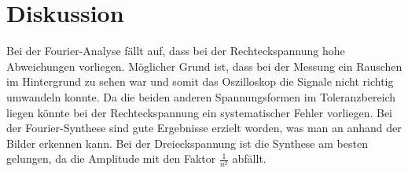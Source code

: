 \section{Diskussion}
Bei der Fourier-Analyse fällt auf, dass bei der Rechteckspannung hohe Abweichungen
vorliegen. Möglicher Grund ist, dass bei der Messung
ein Rauschen im Hintergrund zu sehen war und somit das Oszilloskop die Signale
nicht richtig umwandeln konnte. Da die beiden anderen Spannungsformen im  Toleranzbereich
liegen könnte bei der Rechteckspannung ein systematischer Fehler vorliegen.
Bei der Fourier-Synthese sind gute Ergebnisse erzielt worden, was man an anhand der Bilder
erkennen kann. Bei der Dreieckspannung ist die Synthese am besten gelungen, da die
Amplitude mit den Faktor $\frac{1}{n^2}$ abfällt. 
